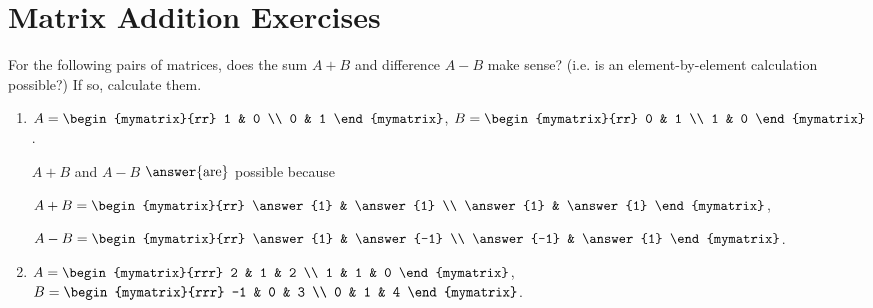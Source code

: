 \documentclass{ximera}
\begin{document}
\section*{Matrix Addition Exercises}

\begin{problem}
  For the following pairs of matrices, does the sum $A+B$ and difference $A-B$ make sense? (i.e. is an element-by-element calculation possible?) If so, calculate them.
  \begin{enumerate}
  \item
    $A = \begin{mymatrix}{rr}
      1 & 0 \\
      0 & 1
    \end{mymatrix}$,\quad
    $B = \begin{mymatrix}{rr}
      0 & 1 \\
      1 & 0
    \end{mymatrix}$.

    \begin{sol}
    

      $A+B$ and $A-B$ $\answer{\text{are}}$ possible because 

      \begin{selectAll}
      \end{selectAll}

      $A+B = \begin{mymatrix}{rr}
        \answer{1} & \answer{1} \\
        \answer{1} & \answer{1}
      \end{mymatrix}$,\quad

      $A-B = \begin{mymatrix}{rr}
        \answer{1} & \answer{-1} \\
        \answer{-1} & \answer{1}
      \end{mymatrix}$.


    \end{sol}

  \item
    $A = \begin{mymatrix}{rrr}
      2 & 1 & 2 \\
      1 & 1 & 0
    \end{mymatrix}$,\quad
    $B = \begin{mymatrix}{rrr}
      -1 & 0 & 3 \\
      0 & 1 & 4
    \end{mymatrix}$.


\end{enumerate}
\end{problem}
\end{document}

